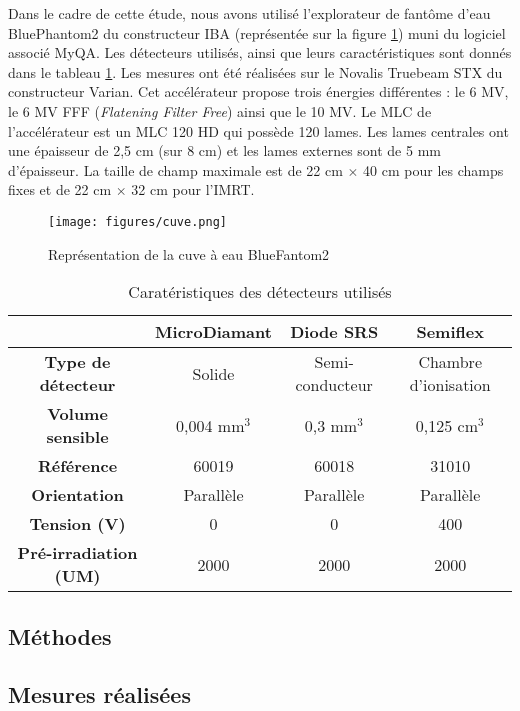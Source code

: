 \documentclass{article}
\begin{document}
Dans le cadre de cette étude, nous avons utilisé l'explorateur de fantôme d'eau BluePhantom2 du constructeur IBA (représentée sur la figure \ref{fig_cuve}) muni du logiciel associé MyQA. Les détecteurs utilisés, ainsi que leurs caractéristiques sont donnés dans le tableau \ref{table_caracteristiques_detecteurs}. Les mesures ont été réalisées sur le Novalis Truebeam STX du constructeur Varian. Cet accélérateur propose trois énergies différentes : le 6 MV, le 6 MV FFF (\textit{Flatening Filter Free}) ainsi que le 10 MV. Le MLC de l'accélérateur est un MLC 120 HD qui possède 120 lames. Les lames centrales ont une épaisseur de 2,5 cm (sur 8 cm) et les lames externes sont de 5 mm d'épaisseur. La taille de champ maximale est de 22 cm $\times$ 40 cm pour les champs fixes et de 22 cm $\times$ 32 cm pour l'IMRT.

\begin{figure}[h]
  \centering
  \texttt{[image: figures/cuve.png]}
  \caption{Représentation de la cuve à eau BlueFantom2}
  \label{fig_cuve}
\end{figure}

\begin{table}[h]
  \centering
  \begin{tabular}{c|ccc|}
  \cline{2-4}
   & \textbf{MicroDiamant} & \textbf{Diode SRS} & \textbf{Semiflex} \\ \hline
  \multicolumn{1}{|c|}{\textbf{Type de détecteur}} & Solide & Semi-conducteur & Chambre d'ionisation \\
  \multicolumn{1}{|c|}{\textbf{Volume sensible}} & 0,004 mm$^3$ & 0,3 mm$^3$ & 0,125 cm$^3$ \\
  \multicolumn{1}{|c|}{\textbf{Référence}} & 60019 & 60018 & 31010 \\
  \multicolumn{1}{|c|}{\textbf{Orientation}} & Parallèle & Parallèle & Parallèle \\
  \multicolumn{1}{|c|}{\textbf{Tension (V)}} & 0 & 0 & 400 \\
  \multicolumn{1}{|c|}{\textbf{Pré-irradiation (UM)}} & 2000 & 2000 & 2000 \\ \hline
  \end{tabular}
  \caption{Caratéristiques des détecteurs utilisés}
  \label{table_caracteristiques_detecteurs}
\end{table}

\subsection{Méthodes}
\subsection{Mesures réalisées}
\end{document}

